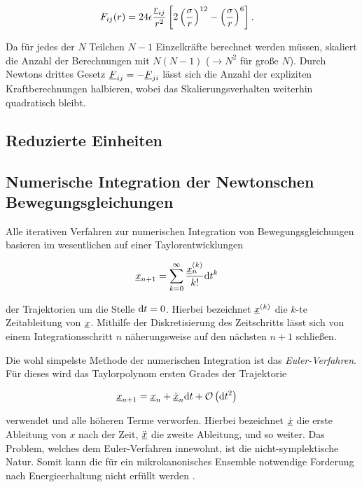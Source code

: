 		\begin{align}
			F_{ij}(r) &= 24\epsilon \frac{\underline{r}_{ij}}{r^2} \left[
				2\left(\frac{\sigma}{r}\right)^{12}
				-
				\left(\frac{\sigma}{r}\right)^{6}
			\right]
			\label{eq:force_lj}
			.
		\end{align}

		Da für jedes der $N$
		Teilchen $N-1$ Einzelkräfte berechnet werden müssen, skaliert die Anzahl der Berechnungen
		mit $N(N-1)$ ($\rightarrow N^2$ für große $N$). Durch Newtons drittes Gesetz
		$\underline{F}_{ij} = -\underline{F}_{ji}$ lässt sich die Anzahl der expliziten Kraftberechnungen
		halbieren, wobei das Skalierungsverhalten weiterhin quadratisch bleibt.

	\subsection{Reduzierte Einheiten}

	\subsection{Numerische Integration der Newtonschen Bewegungsgleichungen}
		Alle iterativen Verfahren zur numerischen Integration von Bewegungsgleichungen basieren
		im wesentlichen auf einer Taylorentwicklungen

		\begin{align}
			\underline{x}_{n+1} &= \sum_{k=0}^\infty \frac{\underline{x}^{(k)}_n}{k!} \text{d} t^k
		\end{align}

		der Trajektorien um die Stelle $\text{d} t = 0$. Hierbei bezeichnet $\underline{x}^{(k)}$ die $k$-te
		Zeitableitung von $\underline{x}$. Mithilfe der Diskretisierung des Zeitschritts \dt lässt sich von einem
		Integrationsschritt $n$ näherungsweise auf den nächsten $n+1$ schließen.

		Die wohl simpelste Methode der numerischen Integration ist das \emph{Euler-Verfahren}.
		Für dieses wird das Taylorpolynom ersten Grades der Trajektorie

		\begin{align}
			\underline{x}_{n+1} &= \underline{x}_n + \dot{\underline{x}}_n \text{d} t + \operatorname{\mathcal{O}}\left(\text{d} t^2\right)
		\end{align}

		verwendet und alle höheren Terme verworfen. Hierbei bezeichnet $\dot{\underline{x}}$ die erste
		Ableitung von $x$ nach der Zeit, $\ddot{\underline{x}}$ die zweite Ableitung, und so weiter.
		Das Problem, welches dem Euler-Verfahren innewohnt, ist die nicht-symplektische Natur.
		Somit kann die für ein mikrokanonisches Ensemble notwendige Forderung nach
		Energieerhaltung nicht erfüllt werden \cite{klein2013klassische}.

